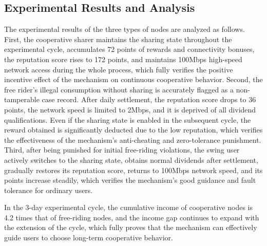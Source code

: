 \documentclass[conference,letterpaper]{IEEEtran}
\begin{document}
\begin{table}[t]
  \centering
  \caption{Initial status of three types of nodes}
  \label{tab:initial}
  \scriptsize
\end{table}

\subsection{Experimental Results and Analysis}

The experimental results of the three types of nodes are analyzed as follows. First, the cooperative sharer maintains the sharing state throughout the experimental cycle, accumulates 72 points of rewards and connectivity bonuses, the reputation score rises to 172 points, and maintains 100Mbps high-speed network access during the whole process, which fully verifies the positive incentive effect of the mechanism on continuous cooperative behavior. Second, the free rider's illegal consumption without sharing is accurately flagged as a non-tamperable case record. After daily settlement, the reputation score drops to 36 points, the network speed is limited to 2Mbps, and it is deprived of all dividend qualifications. Even if the sharing state is enabled in the subsequent cycle, the reward obtained is significantly deducted due to the low reputation, which verifies the effectiveness of the mechanism's anti-cheating and zero-tolerance punishment. Third, after being punished for initial free-riding violations, the swing user actively switches to the sharing state, obtains normal dividends after settlement, gradually restores its reputation score, returns to 100Mbps network speed, and its points increase steadily, which verifies the mechanism's good guidance and fault tolerance for ordinary users.

In the 3-day experimental cycle, the cumulative income of cooperative nodes is 4.2 times that of free-riding nodes, and the income gap continues to expand with the extension of the cycle, which fully proves that the mechanism can effectively guide users to choose long-term cooperative behavior.
\end{document}

